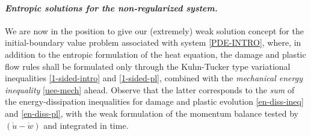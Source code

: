 \documentclass[a4paper,10pt,reqno]{amsart}
\numberwithin{equation}{section}
\numberwithin{equation}{section}
\begin{document}
   \paragraph{\emph{Entropic solutions for the non-regularized system.}}
We are now in the position to give our (extremely) weak solution concept for the initial-boundary value problem associated with system
\eqref{PDE-INTRO}, where,
in addition to the entropic formulation of the heat equation,
 the damage and plastic flow rules shall be formulated only through the 
Kuhn-Tucker type variational inequalities \eqref{1-sided-intro} and \eqref{1-sided-pl}, combined with the 
\emph{mechanical energy inequality} \eqref{uee-mech}  ahead. Observe that the latter corresponds to  the
\emph{sum} of the energy-dissipation inequalities for damage and plastic evolution \eqref{en-diss-ineq} and  \eqref{en-diss-pl}, with the weak formulation of the momentum balance tested by $(\dot{u}{-} \dot{w})$ and integrated in time.
\end{document}
